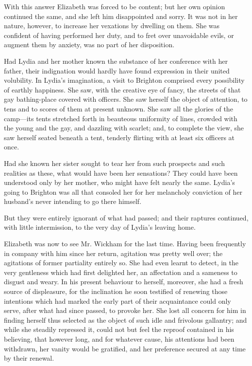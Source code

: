 With this answer Elizabeth was forced to be content; but her own opinion continued the same, and she left him disappointed and sorry. It was not in her nature, however, to increase her vexations by dwelling on them. She was confident of having performed her duty, and to fret over unavoidable evils, or augment them by anxiety, was no part of her disposition.

Had Lydia and her mother known the substance of her conference with her father, their indignation would hardly have found expression in their united volubility. In Lydia's imagination, a visit to Brighton comprised every possibility of earthly happiness. She saw, with the creative eye of fancy, the streets of that gay bathing-place covered with officers. She saw herself the object of attention, to tens and to scores of them at present unknown. She saw all the glories of the camp---its tents stretched forth in beauteous uniformity of lines, crowded with the young and the gay, and dazzling with scarlet; and, to complete the view, she saw herself seated beneath a tent, tenderly flirting with at least six officers at once.

Had she known her sister sought to tear her from such prospects and such realities as these, what would have been her sensations? They could have been understood only by her mother, who might have felt nearly the same. Lydia's going to Brighton was all that consoled her for her melancholy conviction of her husband's never intending to go there himself.

But they were entirely ignorant of what had passed; and their raptures continued, with little intermission, to the very day of Lydia's leaving home.

Elizabeth was now to see Mr. Wickham for the last time. Having been frequently in company with him since her return, agitation was pretty well over; the agitations of former partiality entirely so. She had even learnt to detect, in the very gentleness which had first delighted her, an affectation and a sameness to disgust and weary. In his present behaviour to herself, moreover, she had a fresh source of displeasure, for the inclination he soon testified of renewing those intentions which had marked the early part of their acquaintance could only serve, after what had since passed, to provoke her. She lost all concern for him in finding herself thus selected as the object of such idle and frivolous gallantry; and while she steadily repressed it, could not but feel the reproof contained in his believing, that however long, and for whatever cause, his attentions had been withdrawn, her vanity would be gratified, and her preference secured at any time by their renewal.

